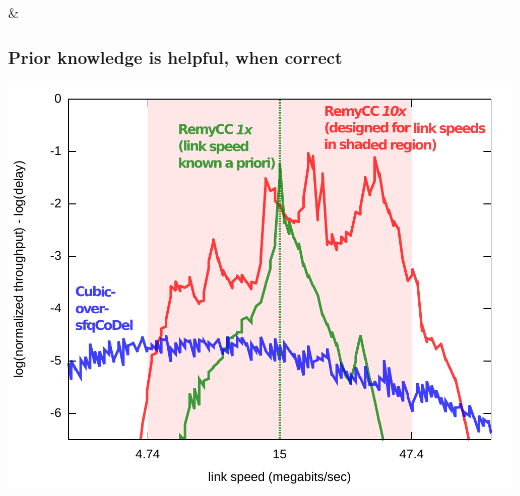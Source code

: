 \documentclass[svgnames]{beamer}
\newcommand{\ssline}{\vspace{8 pt}}
\begin{document}
  & \\
%
%
%
%
%
%

\begin{frame}
\frametitle{Prior knowledge is helpful, when correct}

\begin{centering}
\includegraphics[width=8.5 cm]{spec2.pdf}

\end{centering}

\end{frame}
\end{document}
